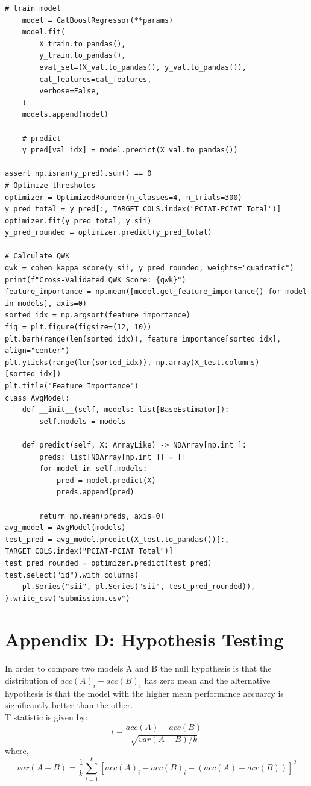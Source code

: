 \documentclass[11pt]{extarticle}
\begin{document}
\begin{mdframed}
\begin{lstlisting}[breaklines=true]
    # train model
    model = CatBoostRegressor(**params)
    model.fit(
        X_train.to_pandas(),
        y_train.to_pandas(),
        eval_set=(X_val.to_pandas(), y_val.to_pandas()),
        cat_features=cat_features,
        verbose=False,
    )
    models.append(model)

    # predict
    y_pred[val_idx] = model.predict(X_val.to_pandas())

assert np.isnan(y_pred).sum() == 0
# Optimize thresholds
optimizer = OptimizedRounder(n_classes=4, n_trials=300)
y_pred_total = y_pred[:, TARGET_COLS.index("PCIAT-PCIAT_Total")]
optimizer.fit(y_pred_total, y_sii)
y_pred_rounded = optimizer.predict(y_pred_total)

# Calculate QWK
qwk = cohen_kappa_score(y_sii, y_pred_rounded, weights="quadratic")
print(f"Cross-Validated QWK Score: {qwk}")
feature_importance = np.mean([model.get_feature_importance() for model in models], axis=0)
sorted_idx = np.argsort(feature_importance)
fig = plt.figure(figsize=(12, 10))
plt.barh(range(len(sorted_idx)), feature_importance[sorted_idx], align="center")
plt.yticks(range(len(sorted_idx)), np.array(X_test.columns)[sorted_idx])
plt.title("Feature Importance")
class AvgModel:
    def __init__(self, models: list[BaseEstimator]):
        self.models = models

    def predict(self, X: ArrayLike) -> NDArray[np.int_]:
        preds: list[NDArray[np.int_]] = []
        for model in self.models:
            pred = model.predict(X)
            preds.append(pred)

        return np.mean(preds, axis=0)
avg_model = AvgModel(models)
test_pred = avg_model.predict(X_test.to_pandas())[:, TARGET_COLS.index("PCIAT-PCIAT_Total")]
test_pred_rounded = optimizer.predict(test_pred)
test.select("id").with_columns(
    pl.Series("sii", pl.Series("sii", test_pred_rounded)),
).write_csv("submission.csv")
\end{lstlisting}
\end{mdframed}
\pagebreak
\section*{Appendix D: Hypothesis Testing}
In order to compare two models A and B the null hypothesis is that the distribution of $acc(A)_i - acc(B)_i$ has zero mean and the alternative hypothesis is that the model with the higher mean performance accuarcy is significantly better than the other.\\
T statistic is given by:
    \[
    t = \frac{\overline{acc}(A) - \overline{acc}(B)}{\sqrt{var(A - B)/k}}
    \]
    where,
    \[
    var(A - B) = \frac{1}{k}\sum_{i=1}^k [acc(A)_i - acc(B)_i - (\overline{acc}(A) - \overline{acc}(B))]^2
    \]
\end{document}
